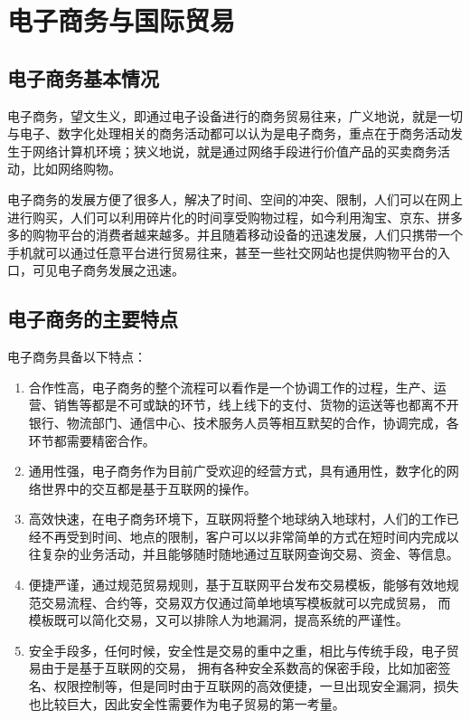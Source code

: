 \chapter{电子商务与国际贸易}
\section{电子商务基本情况}
电子商务，望文生义，即通过电子设备进行的商务贸易往来，广义地说，就是一切与电子、数字化处理相关的商务活动都可以认为是电子商务，重点在于商务活动发生于网络计算机环境；狭义地说，就是通过网络手段进行价值产品的买卖商务活动，比如网络购物。

电子商务的发展方便了很多人，解决了时间、空间的冲突、限制，人们可以在网上进行购买，人们可以利用碎片化的时间享受购物过程，如今利用淘宝、京东、拼多多的购物平台的消费者越来越多。并且随着移动设备的迅速发展，人们只携带一个手机就可以通过任意平台进行贸易往来，甚至一些社交网站也提供购物平台的入口，可见电子商务发展之迅速。

\section{电子商务的主要特点}
电子商务具备以下特点：
\begin{enumerate}[(1)]
\setlength{\itemsep}{0ex}
\item 合作性高，电子商务的整个流程可以看作是一个协调工作的过程，生产、运营、销售等都是不可或缺的环节，线上线下的支付、货物的运送等也都离不开银行、物流部门、通信中心、技术服务人员等相互默契的合作，协调完成，各环节都需要精密合作。
\item 通用性强，电子商务作为目前广受欢迎的经营方式，具有通用性，数字化的网络世界中的交互都是基于互联网的操作。
\item 高效快速，在电子商务环境下，互联网将整个地球纳入地球村，人们的工作已经不再受到时间、地点的限制，客户可以以非常简单的方式在短时间内完成以往复杂的业务活动，并且能够随时随地通过互联网查询交易、资金、等信息。
\item 便捷严谨，通过规范贸易规则，基于互联网平台发布交易模板，能够有效地规范交易流程、合约等，交易双方仅通过简单地填写模板就可以完成贸易，
而模板既可以简化交易，又可以排除人为地漏洞，提高系统的严谨性。
\item 安全手段多，任何时候，安全性是交易的重中之重，相比与传统手段，电子贸易由于是基于互联网的交易，
拥有各种安全系数高的保密手段，比如加密签名、权限控制等，但是同时由于互联网的高效便捷，一旦出现安全漏洞，损失也比较巨大，因此安全性需要作为电子贸易的第一考量。
\end{enumerate}

